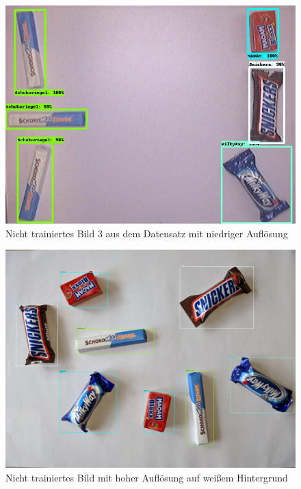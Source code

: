     \begin{figure}[H]
        \centering
        \includegraphics[angle = 90, width = \textwidth]{Bilder/models/model_comparison/ssd_mobilenet_v1_fpn_640x640_coco17_tpu-8/non_trained_3.jpg}
        \caption{Nicht trainiertes Bild 3 aus dem Datensatz mit niedriger Auflösung}
    \end{figure}
    
    \begin{figure}[H]
        \centering
        \includegraphics[angle = 90, width = \textwidth]{Bilder/models/model_comparison/ssd_mobilenet_v1_fpn_640x640_coco17_tpu-8/HD_on_white.jpg}
        \caption{Nicht trainiertes Bild mit hoher Auflösung auf weißem Hintergrund}
    \end{figure}
    
